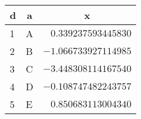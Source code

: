 \begin{table}[!tbp]
\begin{center}
\begin{tabular}{llr}
\hline\hline
\multicolumn{1}{l}{d}&\multicolumn{1}{c}{a}&\multicolumn{1}{c}{x}\tabularnewline
\hline
1&A&$ 0.339237593445830$\tabularnewline
2&B&$-1.066733927114985$\tabularnewline
3&C&$-3.448308114167540$\tabularnewline
4&D&$-0.108747482243757$\tabularnewline
5&E&$ 0.850683113004340$\tabularnewline
\hline
\end{tabular}\end{center}

\end{table}
